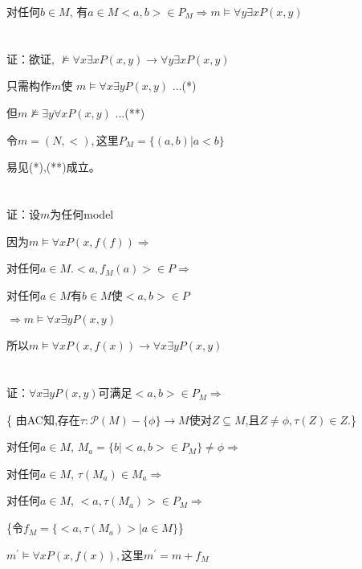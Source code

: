 \documentclass{article}
\begin{document}
\begin{CJK*}{UTF8}{gbsn}
对任何$b\in M$, 有$a\in M <a,b>\in P_M\Rightarrow m\vDash \forall y \exists x  P(x,y)$


\section{}
证：欲证, $\nvDash \forall x \exists x  P(x,y) \rightarrow \forall y \exists x  P(x,y)$

只需构作$m$使 $m \vDash \forall x \exists y  P(x,y)$ ...(*)

但$m \nvDash \exists y \forall x P(x,y)$ ...(**)

令$m = (N, <) ,$这里$P_M =\{(a,b)| a<b\}$

易见(*),(**)成立。


\section{}
证：设$m$为任何model

因为$m \vDash \forall x P(x,f(f)) \Rightarrow$

对任何$a\in M . <a,f_M(a)>\in P \Rightarrow$

对任何$a\in M $有$b \in M$使$<a,b>\in P$

$\Rightarrow m \vDash \forall x \exists y  P(x,y)$

所以$m \vDash \forall x P(x,f(x)) \rightarrow \forall x \exists y  P(x,y)$

\section{}

证：$ \forall x \exists y  P(x,y) $可满足$<a,b>\in P_M \Rightarrow$

\{ 由AC知,存在$\tau : \mathcal{P} (M) -\{\phi\} \rightarrow M$使对$Z \subseteq M$,且$Z \neq \phi, \tau(Z) \in Z.$\}


对任何$a\in M$, $M_a = \{b|<a,b>\in P_M\} \neq \phi \Rightarrow$

对任何$a\in M$, $\tau(M_a) \in M_a \Rightarrow$

对任何$a\in M$, $<a,\tau(M_a)> \in P_M \Rightarrow$

\{令$f_M=\{<a,\tau(M_a)>|a \in M\}$\}

$m^{'} \vDash \forall x P(x,f(x)) ,$这里$m^{'} = m +f_M$


\section{}


\end{CJK*}
\end{document}
